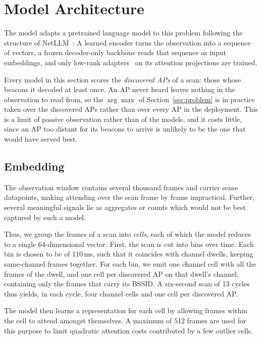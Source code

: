 \documentclass[conference]{IEEEtran}
\begin{document}
\section{Model Architecture}
\label{sec:model}

The model adapts a pretrained language model to this problem following the 
structure of NetLLM~\cite{wu2024netllm}: A learned encoder turns the
observation into a sequence of vectors, a frozen decoder-only backbone reads
that sequence as input embeddings, and only low-rank
adapters~\cite{hu2022lora} on its attention projections are trained.

Every model in this section scores the \emph{discovered APs} of a scan: those
whose beacons it decoded at least once. An AP never heard leaves nothing in the
observation to read from, so the $\arg\max$ of Section~\ref{sec:problem} is in
practice taken over the discovered APs rather than over every AP in the
deployment. This is a limit of passive observation rather than of the models,
and it costs little, since an AP too distant for its beacons to arrive is
unlikely to be the one that would have served best.

\subsection{Embedding}

The observation window contains several thousand frames and carrier sense
datapoints, making attending over the scan frame by frame impractical. Further,
several meaningful signals lie as aggregates or counts which would not be best 
captured by such a model.

Thus, we group the frames of a scan into \emph{cells}, each of which the model
reduces to a single 64-dimensional vector. First, the scan is cut into bins over
time. Each bin is chosen to be of 110\,ms, such that it coincides with channel
dwells, keeping same-channel frames together. For each bin, we emit one channel
cell with all the frames of the dwell, and one cell per discovered AP on that
dwell's channel, containing only the frames that carry its BSSID. A six-second
scan of 13 cycles thus yields, in each cycle, four channel cells and one cell
per discovered AP.

The model then learns a representation for each cell by allowing frames within the 
cell to attend amongst themselves. A maximum of 512 frames are used for this purpose 
to limit quadratic attention costs contributed by a few outlier cells. 
\end{document}
